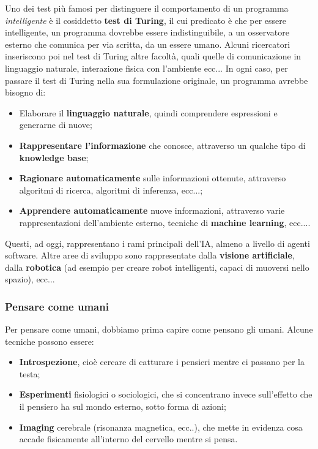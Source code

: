 \documentclass[a4paper,11pt]{article}
\begin{document}
Uno dei test più famosi per distinguere il comportamento di un programma \textit{intelligente} è il cosiddetto \textbf{test di Turing}, il cui predicato è che per essere intelligente, un programma dovrebbe essere indistinguibile, a un osservatore esterno che comunica per via scritta, da un essere umano.
Alcuni ricercatori inseriscono poi nel test di Turing altre facoltà, quali quelle di comunicazione in linguaggio naturale, interazione fisica con l'ambiente ecc...
In ogni caso, per passare il test di Turing nella sua formulazione originale, un programma avrebbe bisogno di:
\begin{itemize}
	\item Elaborare il \textbf{linguaggio naturale}, quindi comprendere espressioni e generarne di nuove;
	\item \textbf{Rappresentare l'informazione} che conosce, attraverso un qualche tipo di \textbf{knowledge base};
	\item \textbf{Ragionare automaticamente} sulle informazioni ottenute, attraverso algoritmi di ricerca, algoritmi di inferenza, ecc...;
	\item \textbf{Apprendere automaticamente} nuove informazioni, attraverso varie rappresentazioni dell'ambiente esterno, tecniche di \textbf{machine learning}, ecc....
\end{itemize}

Questi, ad oggi, rappresentano i rami principali dell'IA, almeno a livello di agenti software.
Altre aree di sviluppo sono rappresentate dalla \textbf{visione artificiale}, dalla \textbf{robotica} (ad esempio per creare robot intelligenti, capaci di muoversi nello spazio), ecc...

\subsubsection{Pensare come umani}
Per pensare come umani, dobbiamo prima capire come pensano gli umani.
Alcune tecniche possono essere:
\begin{itemize}
	\item \textbf{Introspezione}, cioè cercare di catturare i pensieri mentre ci passano per la testa;
	\item \textbf{Esperimenti} fisiologici o sociologici, che si concentrano invece sull'effetto che il pensiero ha sul mondo esterno, sotto forma di azioni;
	\item \textbf{Imaging} cerebrale (risonanza magnetica, ecc..), che mette in evidenza cosa accade fisicamente all'interno del cervello mentre si pensa.
\end{itemize}
\end{document}
